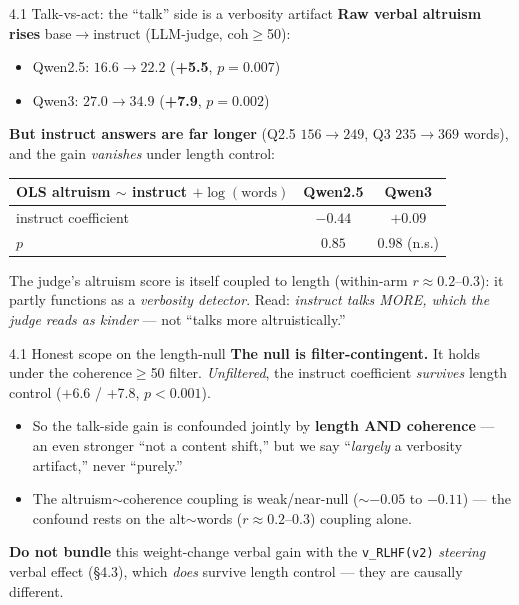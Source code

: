 \documentclass[aspectratio=169,11pt]{beamer}
\begin{document}
\begin{frame}{4.1 Talk-vs-act: the ``talk'' side is a verbosity artifact}
\textbf{Raw verbal altruism rises} base$\to$instruct (LLM-judge, coh$\geq$50):
\begin{itemize}
  \item Qwen2.5: $16.6 \to 22.2$ (\textbf{+5.5}, $p=0.007$)
  \item Qwen3: $27.0 \to 34.9$ (\textbf{+7.9}, $p=0.002$)
\end{itemize}
\textbf{But instruct answers are far longer} (Q2.5 $156\to249$, Q3 $235\to369$ words), and the gain \emph{vanishes} under length control:
\begin{center}
\begin{tabular}{lcc}
\toprule
OLS altruism $\sim$ instruct $+ \log(\text{words})$ & Qwen2.5 & Qwen3 \\
\midrule
instruct coefficient & $-0.44$ & $+0.09$ \\
$p$ & $0.85$ & $0.98$ (n.s.) \\
\bottomrule
\end{tabular}
\end{center}
The judge's altruism score is itself coupled to length (within-arm $r\approx0.2$--$0.3$): it partly functions as a \emph{verbosity detector}. Read: \emph{instruct talks MORE, which the judge reads as kinder} --- not ``talks more altruistically.''
\end{frame}

\begin{frame}{4.1 Honest scope on the length-null}
\textbf{The null is filter-contingent.} It holds under the coherence$\geq$50 filter. \emph{Unfiltered}, the instruct coefficient \emph{survives} length control (+6.6 / +7.8, $p<0.001$).
\begin{itemize}
  \item So the talk-side gain is confounded jointly by \textbf{length AND coherence} --- an even stronger ``not a content shift,'' but we say ``\emph{largely} a verbosity artifact,'' never ``purely.''
  \item The altruism$\sim$coherence coupling is weak/near-null ($\sim-0.05$ to $-0.11$) --- the confound rests on the alt$\sim$words ($r\approx0.2$--$0.3$) coupling alone.
\end{itemize}
\textbf{Do not bundle} this weight-change verbal gain with the \texttt{v\_RLHF(v2)} \emph{steering} verbal effect (\S4.3), which \emph{does} survive length control --- they are causally different.
\end{frame}
\end{document}
